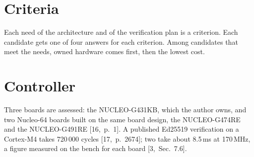 \documentclass[11pt,a4paper]{article}
\begin{document}
\section{Criteria}
Each need of the architecture and of the verification plan is a criterion.
Each candidate gets one of four answers for each criterion. Among candidates
that meet the needs, owned hardware comes first, then the lowest cost.

\smallskip
{}

\section{Controller}
Three boards are assessed: the NUCLEO-G431KB, which the author owns, and two
Nucleo-64 boards built on the same board design, the NUCLEO-G474RE and the
NUCLEO-G491RE [16,~p.~1]. A published Ed25519 verification on a Cortex-M4
takes 720\,000 cycles [17,~p.~2674]; two take about 8.5\,ms at 170\,MHz, a
figure measured on the bench for each board [3,~Sec.~7.6].
\end{document}
